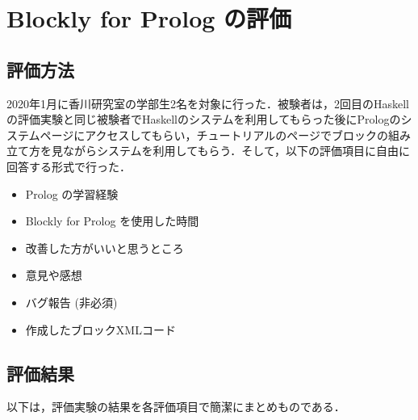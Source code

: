 \documentclass{risepaper}
\begin{document}
   \section{Blockly for Prolog の評価}
   
		\subsection{評価方法}

2020年1月に香川研究室の学部生2名を対象に行った．被験者は，2回目のHaskellの評価実験と同じ被験者でHaskellのシステムを利用してもらった後にPrologのシステムページにアクセスしてもらい，チュートリアルのページでブロックの組み立て方を見ながらシステムを利用してもらう．そして，以下の評価項目に自由に回答する形式で行った．

\begin{itemize}
\item Prolog の学習経験
\item Blockly for Prolog を使用した時間
\item 改善した方がいいと思うところ
\item 意見や感想
\item バグ報告 (非必須)
\item 作成したブロックXMLコード
\end{itemize} 

		\subsection{評価結果}

以下は，評価実験の結果を各評価項目で簡潔にまとめものである．
\end{document}
